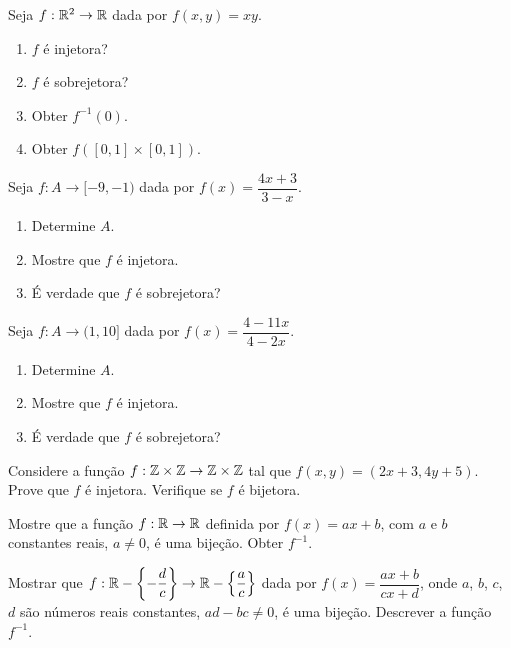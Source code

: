 \documentclass[12pt]{exam}
\begin{document}
\vspace{.3cm}

\questao Seja $f: \mathbb{R}^2 \to \mathbb{R}$ dada por $f(x,y) = xy$.
\begin{enumerate}[label={\alph*})]
	\item $f$ {\'e} injetora?
	\item $f$ {\'e} sobrejetora?
	\item Obter $f^{-1}({0})$.
	\item Obter $f([0,1]\times [0,1])$.
\end{enumerate}

\vspace{.3cm}

\questao Seja $f : A \to [-9,-1)$ dada por $f(x) = \dfrac{4x + 3}{3 - x}$.
\begin{enumerate}[label={\alph*})]
	\item Determine $A$.
	\item Mostre que $f$ é injetora.
	\item É verdade que $f$ é sobrejetora?
\end{enumerate}

\vspace{.3cm}

\questao Seja $f : A \to (1,10]$ dada por $f(x) = \dfrac{4 - 11x}{4 - 2x}$.
\begin{enumerate}[label={\alph*})]
	\item Determine $A$.
	\item Mostre que $f$ é injetora.
	\item É verdade que $f$ é sobrejetora?
\end{enumerate}

\vspace{.3cm}

\questao Considere a fun{\c c}{\~a}o $f : \mathbb{Z} \times \mathbb{Z} \to \mathbb{Z} \times \mathbb{Z}$ tal que $f(x,y) = (2x + 3, 4y + 5)$. Prove que $f$ {\'e} injetora. Verifique se $f$ {\'e} bijetora.

\vspace{.3cm}

\questao Mostre que a fun{\c c}{\~a}o $f : \mathbb{R} \to \mathbb{R}$ definida por $f(x) = ax + b$, com $a$ e $b$ constantes reais, $a \ne 0$, {\'e} uma bije{\c c}{\~a}o. Obter $f^{-1}$.

\vspace{.3cm}

\questao Mostrar que $f : \mathbb{R} - \left\{-\dfrac{d}{c}\right\} \to \mathbb{R}  - \left\{\dfrac{a}{c}\right\}$ dada por $f(x) =  \dfrac{ax + b}{cx + d}$, onde $a$, $b$, $c$, $d$ s{\~a}o n{\'u}meros reais constantes, $ad - bc \ne 0$, {\'e} uma bije{\c c}{\~a}o. Descrever a fun{\c c}{\~a}o $f^{-1}$.
\end{document}
